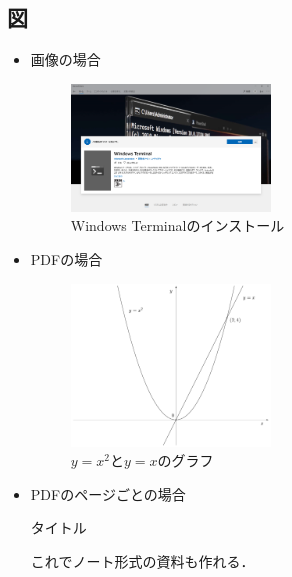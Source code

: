 \documentclass[uplatex]{jsarticle}
\newcommand{\mysection}[1]{\textsf{#1}}
\begin{document}
\subsection{図}
\begin{itemize}
    \item 画像の場合
    \begin{figure}[H]
        \centering
        \includegraphics[width=0.5\textwidth]{./fig/install_terminal.png}
        \caption{Windows Terminalのインストール}
        \label{fig:install_terminal}
    \end{figure}
    \item PDFの場合
    \begin{figure}[H]
        \centering
        \includegraphics[width=0.5\textwidth]{./fig/graph.pdf}
        \caption{$y=x^2$と$y=x$のグラフ}
        \label{fig:graph1}
    \end{figure}
    \newpage
    \item PDFのページごとの場合
    \begin{figure}[H]
        \centering
    \end{figure}
    
    \noindent
    \mysection{タイトル}

    これでノート形式の資料も作れる．
\end{itemize}
\end{document}
